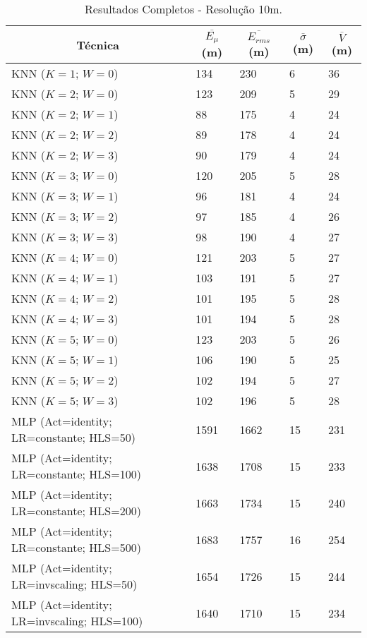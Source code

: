 \begin{center}
\begin{longtable}{|l|l|l|l|l|}
\caption{Resultados Completos - Resolução 10m.} 
\label{table:resultsComplete10m} \\
\hline \multicolumn{1}{|c|}{\textbf{Técnica}} & \multicolumn{1}{c|}{\textbf{$\overline{E_{\mu}}$ (m)}} & \multicolumn{1}{c|}{\textbf{$\overline{E_{rms}}$ (m)}} & \multicolumn{1}{c|}{\textbf{$\overline{\sigma}$ (m)}} & \multicolumn{1}{c|}{\textbf{$\overline{V}$ (m)}} \\ \hline 
\endfirsthead
\hline
\endlastfoot
KNN ($K=1$; $W=0$) & 134 & 230 & 6 & 36 \\
KNN ($K=2$; $W=0$) & 123 & 209 & 5 & 29 \\
KNN ($K=2$; $W=1$) & 88 & 175 & 4 & 24 \\
KNN ($K=2$; $W=2$) & 89 & 178 & 4 & 24 \\
KNN ($K=2$; $W=3$) & 90 & 179 & 4 & 24 \\
KNN ($K=3$; $W=0$) & 120 & 205 & 5 & 28 \\
KNN ($K=3$; $W=1$) & 96 & 181 & 4 & 24 \\
KNN ($K=3$; $W=2$) & 97 & 185 & 4 & 26 \\
KNN ($K=3$; $W=3$) & 98 & 190 & 4 & 27 \\
KNN ($K=4$; $W=0$) & 121 & 203 & 5 & 27 \\
KNN ($K=4$; $W=1$) & 103 & 191 & 5 & 27 \\
KNN ($K=4$; $W=2$) & 101 & 195 & 5 & 28 \\
KNN ($K=4$; $W=3$) & 101 & 194 & 5 & 28 \\
KNN ($K=5$; $W=0$) & 123 & 203 & 5 & 26 \\
KNN ($K=5$; $W=1$) & 106 & 190 & 5 & 25 \\
KNN ($K=5$; $W=2$) & 102 & 194 & 5 & 27 \\
KNN ($K=5$; $W=3$) & 102 & 196 & 5 & 28 \\
MLP (Act=identity; LR=constante; HLS=50) & 1591 & 1662 & 15 & 231 \\
MLP (Act=identity; LR=constante; HLS=100) & 1638 & 1708 & 15 & 233 \\
MLP (Act=identity; LR=constante; HLS=200) & 1663 & 1734 & 15 & 240 \\
MLP (Act=identity; LR=constante; HLS=500) & 1683 & 1757 & 16 & 254 \\
MLP (Act=identity; LR=invscaling; HLS=50) & 1654 & 1726 & 15 & 244 \\
MLP (Act=identity; LR=invscaling; HLS=100) & 1640 & 1710 & 15 & 234 \\

\end{longtable}
\end{center}
